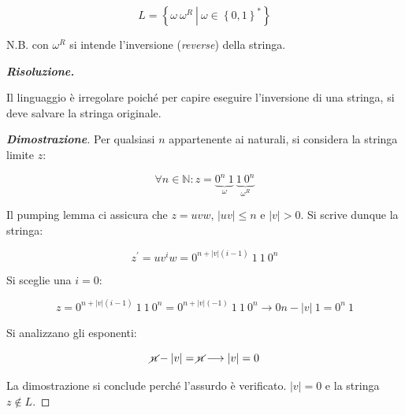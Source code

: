 \documentclass[a4paper]{article}
\begin{document}
	\begin{equation*}
		L = \left\{\omega \: \omega^{R} \: \left| \: \omega \in \left\{0,1\right\}^{*} \right.\right\}
	\end{equation*}\newline

	\noindent
	N.B. con $\omega^{R}$ si intende l'inversione (\emph{reverse}) della stringa.\newline
	
	\noindent
	\textcolor{Green4}{\textbf{\emph{Risoluzione.}}}\newline
	
	\noindent
	Il linguaggio è irregolare poiché per capire eseguire l'inversione di una stringa, si deve salvare la stringa originale.
	
	\begin{proof}[\textcolor{Blue3}{\textbf{Dimostrazione}}]
		Per qualsiasi $n$ appartenente ai naturali, si considera la stringa limite $z$:
		
		\begin{equation*}
			\forall n \in \mathbb{N} : z = \underbrace{0^{n} \: 1}_{\omega} \: \underbrace{1 \: 0^{n}}_{\omega^{R}}
		\end{equation*}
	
		\noindent
		Il pumping lemma ci assicura che $z = uvw$, $|uv| \le n$ e $|v| > 0$. Si scrive dunque la stringa:
		
		\begin{equation*}
			z^{'} = uv^{i}w = 0^{n + |v|\left(i-1\right)} \: 1 \: 1 \: 0^{n}
		\end{equation*}
	
		\noindent
		Si sceglie una $i = 0$:
		
		\begin{equation*}
			z = 0^{n + |v|\left(i-1\right)} \: 1 \: 1 \: 0^{n} = 0^{n + |v|\left(-1\right)} \: 1 \: 1 \: 0^{n} \longrightarrow 0{n - |v|} \: 1 = 0^{n} \: 1
		\end{equation*}
	
		\noindent
		Si analizzano gli esponenti:
		
		\begin{equation*}
			\cancel{n} - |v| = \cancel{n} \longrightarrow |v| = 0
		\end{equation*}
	
		\noindent
		La dimostrazione si conclude perché l'assurdo è verificato. $|v| = 0$ e la stringa $z \notin L$.
	\end{proof}

	\newpage
	
\end{document}
